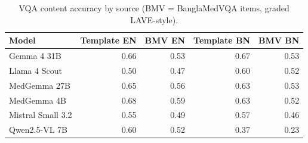 \begin{table}[!htbp]
\centering
\small
\begin{tabular}{lrrrr}
\toprule
Model & Template EN & BMV EN & Template BN & BMV BN \\
\midrule
Gemma 4 31B & 0.66 & 0.53 & 0.67 & 0.53 \\
Llama 4 Scout & 0.50 & 0.47 & 0.60 & 0.52 \\
MedGemma 27B & 0.65 & 0.56 & 0.63 & 0.53 \\
MedGemma 4B & 0.68 & 0.59 & 0.63 & 0.52 \\
Mistral Small 3.2 & 0.55 & 0.49 & 0.57 & 0.46 \\
Qwen2.5-VL 7B & 0.60 & 0.52 & 0.37 & 0.23 \\
\bottomrule
\end{tabular}
\caption{VQA content accuracy by source (BMV = BanglaMedVQA items, graded LAVE-style).}
\label{tab:vqasrc}
\end{table}
